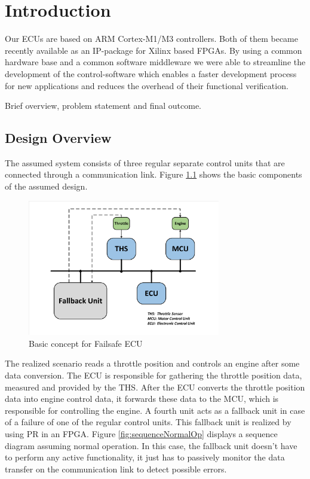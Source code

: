 \chapter{Introduction}

Our \glspl{ECU} are based on ARM Cortex-M1/M3 controllers. Both of them became recently available as an \gls{IP}-package for Xilinx based \glspl{FPGA}.
By using a common hardware base and a common software middleware we were able to streamline the development of the control-software which enables a faster development process for new applications and reduces the overhead of their functional verification.
 
Brief overview, problem statement and final outcome.

\section{Design Overview}

The assumed system consists of three regular separate control units that are connected through a communication link. Figure \ref{fig:basicDesign} shows the basic components of the assumed design.

\begin{figure}[h!]
    \centering
    \includegraphics[width=0.75\textwidth]{figures/basic_design.pdf}
    \caption{Basic concept for Failsafe ECU}\label{fig:basicDesign}
\end{figure}

The realized scenario reads a throttle position and controls an engine after some data conversion. The \gls{ECU} is responsible for gathering the throttle position data, measured and provided by the \gls{THS}. After the \gls{ECU} converts the throttle position data into engine control data, it forwards these data to the \gls{MCU}, which is responsible for controlling the engine. A fourth unit acts as a fallback unit in case of a failure of one of the regular control units. This fallback unit is realized by using \gls{PR} in an \gls{FPGA}. Figure \ref{fig:sequenceNormalOp} displays a sequence diagram assuming normal operation. In this case, the fallback unit doesn't have to perform any active functionality, it just has to passively monitor the data transfer on the communication link to detect possible errors.

